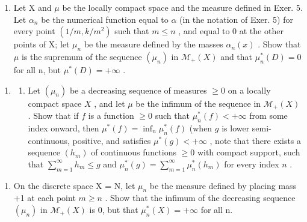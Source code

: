 \begin{enumerate}
\def\labelenumi{\alph{enumi})}
\setcounter{enumi}{1}
\tightlist
\item
  Let X and \(\mu\) be the locally compact space and the measure defined in Exer. 5. Let \(\alpha_{n}\) be the numerical function equal to \(\alpha\) (in the notation of Exer. 5) for every point \((1/m, k/m^{2})\) such that \(m \leqslant n\) , and equal to 0 at the other points of X; let \(\mu_{n}\) be the measure defined by the masses \(\alpha_{n}(x)\) . Show that \(\mu\) is the supremum of the sequence \((\mu_{n})\) in \(\mathcal{M}_{+}(X)\) and that \(\mu_{n}^{*}(D)=0\) for all n, but \(\mu^{*}(D)=+\infty\) .
\end{enumerate}

\begin{enumerate}
\def\labelenumi{\arabic{enumi})}
\setcounter{enumi}{7}
\tightlist
\item
  \begin{enumerate}
  \def\labelenumii{\alph{enumii})}
  \tightlist
  \item
    Let \((\mu_n)\) be a decreasing sequence of measures \(\geqslant 0\) on a locally compact space \(X\) , and let \(\mu\) be the infimum of the sequence in \(\mathcal{M}_+(X)\) . Show that if \(f\) is a function \(\geqslant 0\) such that \(\mu_n^*(f) < +\infty\) from some index onward, then \(\mu^*(f) = \inf_n \mu_n^*(f)\) (when \(g\) is lower semi-continuous, positive, and satisfies \(\mu^*(g) < +\infty\) , note that there exists a sequence \((h_m)\) of continuous functions \(\geqslant 0\) with compact support, such that \(\sum_{m=1}^{\infty} h_m \leqslant g\) and \(\mu_n^*(g) = \sum_{m=1}^{\infty} \mu_n^*(h_m)\) for every index \(n\) .
  \end{enumerate}
\end{enumerate}

\begin{enumerate}
\def\labelenumi{\alph{enumi})}
\setcounter{enumi}{1}
\tightlist
\item
  On the discrete space X = N, let \(\mu_{n}\) be the measure defined by placing mass +1 at each point \(m \geqslant n\) . Show that the infimum of the decreasing sequence \((\mu_{n})\) in \(\mathcal{M}_{+}(X)\) is 0, but that \(\mu_{n}^{*}(X) = +\infty\) for all n.
\end{enumerate}

\setcounter{exercisegroup}{3}
\edef\CurrentExerciseGroup{\arabic{exercisegroup}}
